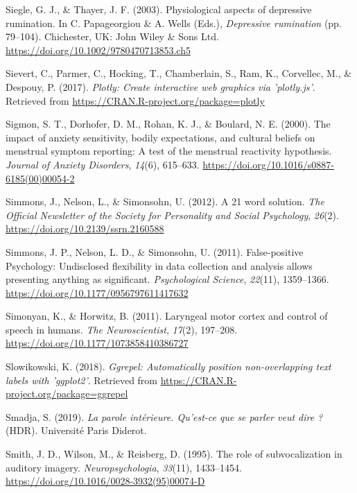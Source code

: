 \documentclass[a4paper,12pt,twoside,onecolumn,openright,final,oldfontcommands]{memoir}
\begin{document}
\leavevmode\hypertarget{ref-papageorgiou_physiological_2003}{}%
Siegle, G. J., \& Thayer, J. F. (2003). Physiological aspects of depressive rumination. In C. Papageorgiou \& A. Wells (Eds.), \emph{Depressive rumination} (pp. 79--104). Chichester, UK: John Wiley \& Sons Ltd. \url{https://doi.org/10.1002/9780470713853.ch5}

\leavevmode\hypertarget{ref-R-plotly}{}%
Sievert, C., Parmer, C., Hocking, T., Chamberlain, S., Ram, K., Corvellec, M., \& Despouy, P. (2017). \emph{Plotly: Create interactive web graphics via 'plotly.js'}. Retrieved from \url{https://CRAN.R-project.org/package=plotly}

\leavevmode\hypertarget{ref-sigmon_impact_2000}{}%
Sigmon, S. T., Dorhofer, D. M., Rohan, K. J., \& Boulard, N. E. (2000). The impact of anxiety sensitivity, bodily expectations, and cultural beliefs on menstrual symptom reporting: A test of the menstrual reactivity hypothesis. \emph{Journal of Anxiety Disorders}, \emph{14}(6), 615--633. \url{https://doi.org/10.1016/s0887-6185(00)00054-2}

\leavevmode\hypertarget{ref-simmons_21_2012}{}%
Simmons, J., Nelson, L., \& Simonsohn, U. (2012). A 21 word solution. \emph{The Official Newsletter of the Society for Personality and Social Psychology}, \emph{26}(2). \url{https://doi.org/10.2139/ssrn.2160588}

\leavevmode\hypertarget{ref-simmons_false-positive_2011}{}%
Simmons, J. P., Nelson, L. D., \& Simonsohn, U. (2011). False-positive Psychology: Undisclosed flexibility in data collection and analysis allows presenting anything as significant. \emph{Psychological Science}, \emph{22}(11), 1359--1366. \url{https://doi.org/10.1177/0956797611417632}

\leavevmode\hypertarget{ref-simonyan_laryngeal_2011}{}%
Simonyan, K., \& Horwitz, B. (2011). Laryngeal motor cortex and control of speech in humans. \emph{The Neuroscientist}, \emph{17}(2), 197--208. \url{https://doi.org/10.1177/1073858410386727}

\leavevmode\hypertarget{ref-R-ggrepel}{}%
Slowikowski, K. (2018). \emph{Ggrepel: Automatically position non-overlapping text labels with 'ggplot2'}. Retrieved from \url{https://CRAN.R-project.org/package=ggrepel}

\leavevmode\hypertarget{ref-smadja_parole_2019}{}%
Smadja, S. (2019). \emph{La parole intérieure. Qu'est-ce que se parler veut dire ?} (HDR). Université Paris Diderot.

\leavevmode\hypertarget{ref-smith_role_1995}{}%
Smith, J. D., Wilson, M., \& Reisberg, D. (1995). The role of subvocalization in auditory imagery. \emph{Neuropsychologia}, \emph{33}(11), 1433--1454. \url{https://doi.org/10.1016/0028-3932(95)00074-D}
\end{document}
